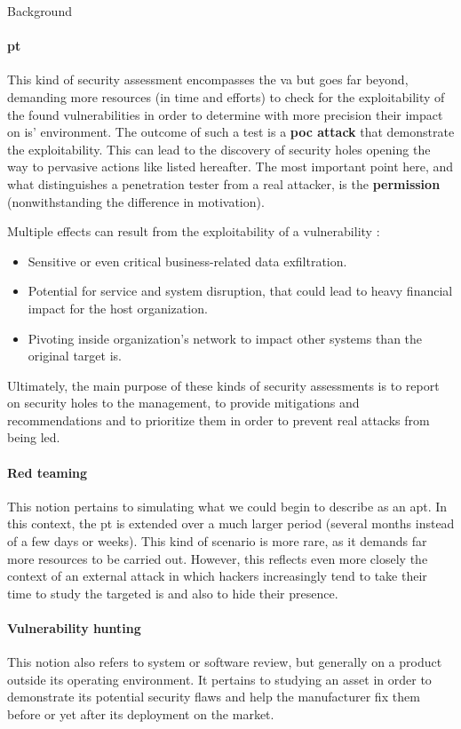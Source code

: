 \begin{chaptercover}{Background}
\paragraph{\acrfull{pt}} This kind of security assessment encompasses the \acrshort{va} but goes far beyond, demanding more resources (in time and efforts) to check for the exploitability of the found vulnerabilities in order to determine with more precision their impact on \acrshort{is}' environment. The outcome of such a test is a \textbf{\acrfull{poc} attack} that demonstrate the exploitability. This can lead to the discovery of security holes opening the way to pervasive actions like listed hereafter. The most important point here, and what distinguishes a penetration tester from a real attacker, is the \textbf{permission} (nonwithstanding the difference in motivation).

Multiple effects can result from the exploitability of a vulnerability :
\begin{itemize}[itemsep=0.1cm,topsep=0.1cm]
  \item Sensitive or even critical business-related data exfiltration.
  \item Potential for service and system disruption, that could lead to heavy financial impact for the host organization.
  \item Pivoting inside organization's network to impact other systems than the original target \acrshort{is}.
\end{itemize}

Ultimately, the main purpose of these kinds of security assessments is to report on security holes to the management, to provide mitigations and recommendations and to prioritize them in order to prevent real attacks from being led.

\paragraph{Red teaming} This notion pertains to simulating what we could begin to describe as an \acrfull{apt}. In this context, the \acrshort{pt} is extended over a much larger period (several months instead of a few days or weeks). This kind of scenario is more rare, as it demands far more resources to be carried out. However, this reflects even more closely the context of an external attack in which hackers increasingly tend to take their time to study the targeted \acrshort{is} and also to hide their presence.

\paragraph{Vulnerability hunting} This notion also refers to system or software review, but generally on a product outside its operating environment. It pertains to studying an asset in order to demonstrate its potential security flaws and help the manufacturer fix them before or yet after its deployment on the market.


\end{chaptercover}
